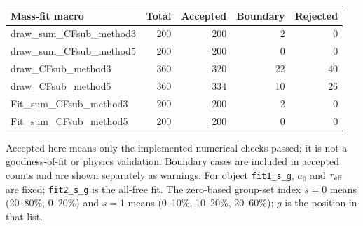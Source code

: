 \documentclass[11pt,a4paper]{article}
\begin{document}
{\small\begin{longtable}{lrrrr}\hline Mass-fit macro & Total & Accepted & Boundary & Rejected\\\hline\endhead
draw\_sum\_CFsub\_method3 & 200 & 200 & 2 & 0\\
draw\_sum\_CFsub\_method5 & 200 & 200 & 0 & 0\\
draw\_CFsub\_method3 & 360 & 320 & 22 & 40\\
draw\_CFsub\_method5 & 360 & 334 & 10 & 26\\
Fit\_sum\_CFsub\_method3 & 200 & 200 & 2 & 0\\
Fit\_sum\_CFsub\_method5 & 200 & 200 & 0 & 0\\
\hline\end{longtable}}
Accepted here means only the implemented numerical checks passed; it is not a goodness-of-fit or physics validation. Boundary cases are included in accepted counts and are shown separately as warnings.
For object \texttt{fit1\_s\_g}, $a_0$ and $r_{\rm eff}$ are fixed; \texttt{fit2\_s\_g} is the all-free fit. The zero-based group-set index $s=0$ means (20--80\%, 0--20\%) and $s=1$ means (0--10\%, 10--20\%, 20--60\%); $g$ is the position in that list.
\end{document}
